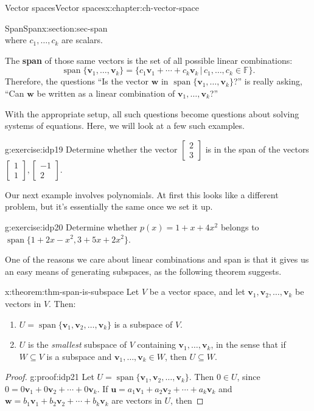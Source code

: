 \documentclass[oneside,10pt,]{book}
\newcommand{\terminology}[1]{\textbf{#1}}
\numberwithin{equation}{section}
\newcommand{\spn}{\operatorname{span}}
\newcommand{\bbm}{\begin{bmatrix}}
\newcommand{\ebm}{\end{bmatrix}}
\newcommand{\uu}{\mathbf{u}}
\newcommand{\vv}{\mathbf{v}}
\newcommand{\ww}{\mathbf{w}}
\begin{document}
\begin{chapterptx}{Vector spaces}{}{Vector spaces}{}{}{x:chapter:ch-vector-space}
\begin{sectionptx}{Span}{}{Span}{}{}{x:section:sec-span}
\begin{equation*}
\end{equation*}
where \(c_1,\ldots, c_k\) are scalars.%
\par
The \terminology{span} of those same vectors is the set of all possible linear combinations:%
\begin{equation*}
\spn\{\vv_1,\ldots, \vv_k\} = \{c_1\vv_1+ \cdots + c_k\vv_k \,|\, c_1,\ldots, c_k \in \mathbb{F}\}.
\end{equation*}
Therefore, the questions ``Is the vector \(\ww\) in \(\spn\{\vv_1,\ldots, \vv_k\}\)?'' is really asking, ``Can \(\ww\) be written as a linear combination of \(\vv_1,\ldots, \vv_k\)?''%
\par
With the appropriate setup, all such questions become questions about solving systems of equations. Here, we will look at a few such examples.%
\begin{inlineexercise}{}{g:exercise:idp19}%
Determine whether the vector \(\bbm 2\\3\ebm\) is in the span of the vectors \(\bbm 1\\1\ebm,\bbm -1\\2\ebm\).%
\end{inlineexercise}%
Our next example involves polynomials. At first this looks like a different problem, but it's essentially the same once we set it up.%
\begin{inlineexercise}{}{g:exercise:idp20}%
Determine whether \(p(x)=1+x+4x^2\) belongs to \(\spn\{1+2x-x^2,3+5x+2x^2\}\).%
\end{inlineexercise}%
One of the reasons we care about linear combinations and span is that it gives us an easy means of generating subspaces, as the following theorem suggests.%
\begin{theorem}{}{}{x:theorem:thm-span-is-subspace}%
Let \(V\) be a vector space, and let \(\vv_1,\vv_2,\ldots, \vv_k\) be vectors in \(V\). Then:%
\begin{enumerate}
\item{}\(U=\spn\{\vv_1,\vv_2,\ldots, \vv_k\}\) is a subspace of \(V\).%
\item{}\(U\) is the \emph{smallest} subspace of  \(V\) containing \(\vv_1,\ldots, \vv_k\), in the sense that if \(W\subseteq V\) is a subspace and \(\vv_1,\ldots, \vv_k\in W\), then \(U\subseteq W\).%
\end{enumerate}
%
\end{theorem}
\begin{proof}{}{g:proof:idp21}
Let \(U=\spn\{\vv_1,\vv_2,\ldots, \vv_k\}\). Then \(0\in U\), since \(0=0\vv_1+0\vv_2+\cdots + 0\vv_k\). If \(\uu=a_1\vv_1+a_2\vv_2+\cdots +a_k\vv_k\) and \(\ww=b_1\vv_1+b_2\vv_2+\cdots +b_k\vv_k\) are vectors in \(U\), then%

\end{proof}
\end{sectionptx}
\end{chapterptx}
\end{document}

